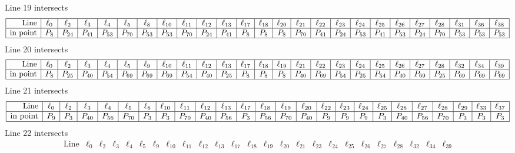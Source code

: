 \documentclass{article}
\begin{document}
{$$$$
Line 19 intersects 
$$
\begin{array}{|r*{24}{|c}|}
\hline
\mbox{Line}  & \ell_{0} & \ell_{2} & \ell_{3} & \ell_{4} & \ell_{5} & \ell_{8} & \ell_{10} & \ell_{11} & \ell_{12} & \ell_{13} & \ell_{17} & \ell_{18} & \ell_{20} & \ell_{21} & \ell_{22} & \ell_{23} & \ell_{24} & \ell_{25} & \ell_{26} & \ell_{27} & \ell_{28} & \ell_{31} & \ell_{36} & \ell_{38}\\
\hline
\mbox{in point}  & P_{8} & P_{24} & P_{41} & P_{53} & P_{70} & P_{53} & P_{53} & P_{70} & P_{24} & P_{41} & P_{8} & P_{8} & P_{8} & P_{70} & P_{41} & P_{24} & P_{53} & P_{41} & P_{53} & P_{24} & P_{70} & P_{53} & P_{53} & P_{53}\\
\hline
\end{array}
$$
Line 20 intersects 
$$
\begin{array}{|r*{24}{|c}|}
\hline
\mbox{Line}  & \ell_{0} & \ell_{2} & \ell_{3} & \ell_{4} & \ell_{5} & \ell_{9} & \ell_{10} & \ell_{11} & \ell_{12} & \ell_{13} & \ell_{17} & \ell_{18} & \ell_{19} & \ell_{21} & \ell_{22} & \ell_{23} & \ell_{24} & \ell_{25} & \ell_{26} & \ell_{27} & \ell_{28} & \ell_{32} & \ell_{34} & \ell_{39}\\
\hline
\mbox{in point}  & P_{8} & P_{25} & P_{40} & P_{54} & P_{69} & P_{69} & P_{69} & P_{54} & P_{40} & P_{25} & P_{8} & P_{8} & P_{8} & P_{40} & P_{69} & P_{54} & P_{25} & P_{54} & P_{40} & P_{69} & P_{25} & P_{69} & P_{69} & P_{69}\\
\hline
\end{array}
$$
Line 21 intersects 
$$
\begin{array}{|r*{24}{|c}|}
\hline
\mbox{Line}  & \ell_{0} & \ell_{2} & \ell_{3} & \ell_{4} & \ell_{5} & \ell_{6} & \ell_{10} & \ell_{11} & \ell_{12} & \ell_{13} & \ell_{17} & \ell_{18} & \ell_{19} & \ell_{20} & \ell_{22} & \ell_{23} & \ell_{24} & \ell_{25} & \ell_{26} & \ell_{27} & \ell_{28} & \ell_{29} & \ell_{33} & \ell_{37}\\
\hline
\mbox{in point}  & P_{9} & P_{3} & P_{40} & P_{56} & P_{70} & P_{3} & P_{3} & P_{70} & P_{40} & P_{56} & P_{3} & P_{56} & P_{70} & P_{40} & P_{9} & P_{9} & P_{9} & P_{3} & P_{40} & P_{56} & P_{70} & P_{3} & P_{3} & P_{3}\\
\hline
\end{array}
$$
Line 22 intersects 
$$
\begin{array}{|r*{24}{|c}|}
\hline
\mbox{Line}  & \ell_{0} & \ell_{2} & \ell_{3} & \ell_{4} & \ell_{5} & \ell_{9} & \ell_{10} & \ell_{11} & \ell_{12} & \ell_{13} & \ell_{17} & \ell_{18} & \ell_{19} & \ell_{20} & \ell_{21} & \ell_{23} & \ell_{24} & \ell_{25} & \ell_{26} & \ell_{27} & \ell_{28} & \ell_{32} & \ell_{34} & \ell_{39}\\

\end{array}$$}
\end{document}
